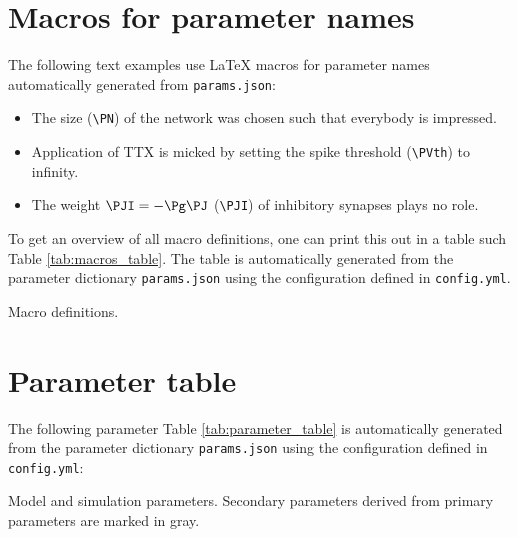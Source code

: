\documentclass[10pt,a4paper,american]{article}
\begin{document}
\section{Macros for parameter names}



The following text examples use LaTeX macros for parameter names automatically generated from \texttt{params.json}:
\begin{itemize}
\item The size \PN (\verb+\PN+) of the network was chosen such that everybody is impressed.
\item Application of TTX is micked by setting the spike threshold \PVth (\verb+\PVth+) to infinity.
\item The weight $\PJI=-\Pg\PJ$ (\verb+\PJI+) of inhibitory synapses plays no role.
\end{itemize}
To get an overview of all macro definitions, one can print this out in a table such Table \ref{tab:macros_table}. The table is automatically generated from the parameter dictionary \texttt{params.json} using the configuration defined in \texttt{config.yml}.
\begin{table}[ht!]
\begin{center}
  \parbox{0.8\linewidth}{       %
    \small%
    \centering%
    \renewcommand{\arraystretch}{1.2}%
    \noindent%
    \caption{Macro definitions.}
    \label{tab:macros_table}
  }
\end{center}
\end{table}

\section{Parameter table}
The following parameter Table \ref{tab:parameter_table} is automatically generated from the parameter dictionary \texttt{params.json} using the configuration defined in \texttt{config.yml}: 
\begin{table}[ht!]
\begin{center}
  \parbox{0.8\linewidth}{       %
    \small%
    \centering%
    \renewcommand{\arraystretch}{1.2}%
    \noindent%
    \caption{Model and simulation parameters. Secondary parameters derived from primary parameters are marked in gray.}
    \label{tab:parameter_table}
  }
\end{center}
\end{table}
\end{document}
